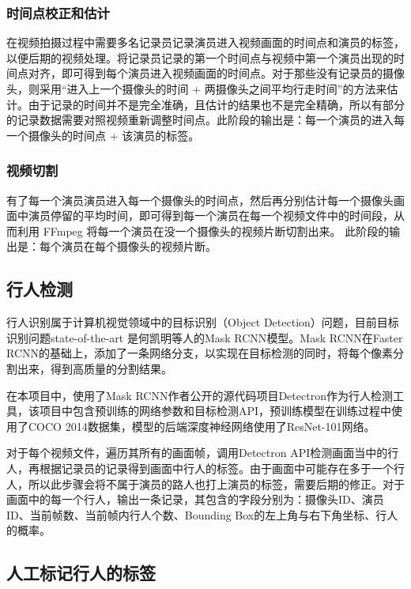 \subsubsection{时间点校正和估计}

在视频拍摄过程中需要多名记录员记录演员进入视频画面的时间点和演员的标签，以便后期的视频处理。将记录员记录的第一个时间点与视频中第一个演员出现的时间点对齐，即可得到每个演员进入视频画面的时间点。对于那些没有记录员的摄像头，则采用“进入上一个摄像头的时间 + 两摄像头之间平均行走时间”的方法来估计。由于记录的时间并不是完全准确，且估计的结果也不是完全精确，所以有部分的记录数据需要对照视频重新调整时间点。此阶段的输出是：每一个演员的进入每一个摄像头的时间点 + 该演员的标签。

\subsubsection{视频切割}
有了每一个演员演员进入每一个摄像头的时间点，然后再分别估计每一个摄像头画面中演员停留的平均时间，即可得到每一个演员在每一个视频文件中的时间段，从而利用 FFmpeg 将每一个演员在没一个摄像头的视频片断切割出来。
此阶段的输出是：每个演员在每个摄像头的视频片断。

\subsection{行人检测}
行人识别属于计算机视觉领域中的目标识别（Object Detection）问题，目前目标识别问题state-of-the-art 是何凯明等人的Mask RCNN\cite{he2017mask}模型。Mask RCNN在Faster RCNN\cite{ren2015faster}的基础上，添加了一条网络分支，以实现在目标检测的同时，将每个像素分割出来，得到高质量的分割结果。

在本项目中，使用了Mask RCNN作者公开的源代码项目Detectron\cite{Detectron2018}作为行人检测工具，该项目中包含预训练的网络参数和目标检测API，预训练模型在训练过程中使用了COCO 2014\cite{lin2014microsoft}数据集，模型的后端深度神经网络使用了ResNet-101\cite{he2016deep}网络。

对于每个视频文件，遍历其所有的画面帧，调用Detectron API检测画面当中的行人，再根据记录员的记录得到画面中行人的标签。由于画面中可能存在多于一个行人，所以此步骤会将不属于演员的路人也打上演员的标签，需要后期的修正。对于画面中的每一个行人，输出一条记录，其包含的字段分别为：摄像头ID、演员ID、当前帧数、当前帧内行人个数、Bounding Box的左上角与右下角坐标、行人的概率。

\subsection{人工标记行人的标签}

